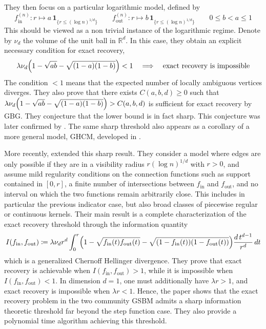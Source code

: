 \documentclass[runningheads]{llncs}
\begin{document}
They then focus on a particular logarithmic model, defined by
\[
f_\mathrm{in}^{(n)}: r \mapsto a\,\mathbf 1_{\{r\le (\log n)^{1/d}\}}
\qquad
f_\mathrm{out}^{(n)}: r \mapsto b\,\mathbf 1_{\{r\le (\log n)^{1/d}\}}
\qquad 0\le b<a\le 1
\]
This should be viewed as a non trivial instance of the logarithmic regime. Denote by \(\nu_d\) the volume of the unit ball in \(\mathbb R^d\). In this case, they obtain an explicit necessary condition for exact recovery,
\begin{equation}\label{eq:GSBM_log_impossibility}
    \lambda \nu_d\Bigl(1-\sqrt{ab}-\sqrt{(1-a)(1-b)}\Bigr)<1
    \quad\Longrightarrow\quad
    \text{exact recovery is impossible}
\end{equation}
The condition \(<1\) means that the expected number of locally ambiguous vertices diverges. They also prove that there exists \(C(a,b,d) \geq 0\) such that
\(\lambda \nu_d\Bigl(1-\sqrt{ab}-\sqrt{(1-a)(1-b)}\Bigr)>C(a,b,d)\) 
is sufficient for exact recovery by GBG. They conjecture that the lower bound is in fact sharp. This conjecture was later confirmed by \citep{gaudio2024exactcommunityrecoverygeometric}. The same sharp threshold also appears as a corollary of a more general model, GHCM, developed in \citep{gaudio2024exact}.

More recently, \citep{gaudio2025exactrecoverygeometricsbm} extended this sharp result. They consider a model where edges are only possible if they are in a visibility radius \(r(\log n)^{1/d}\) with \(r>0\), and assume mild regularity conditions on the connection functions such as support contained in \([0,r]\), a finite number of intersections between \(f_\mathrm{in}\) and \(f_\mathrm{out}\), and no interval on which the two functions remain arbitrarily close. This includes in particular the previous indicator case, but also broad classes of piecewise regular or continuous kernels. Their main result is a complete characterization of the exact recovery threshold through the information quantity
\[
I(f_\mathrm{in},f_\mathrm{out})
\coloneqq
\lambda \nu_d r^d
\int_0^r
\Bigl(
1-\sqrt{f_\mathrm{in}(t)f_\mathrm{out}(t)}
-\sqrt{(1-f_\mathrm{in}(t))(1-f_\mathrm{out}(t))}
\Bigr)
\frac{d\,t^{d-1}}{r^d}\,dt
\]
which is a generalized Chernoff Hellinger divergence. They prove that exact recovery is achievable when \(I(f_\mathrm{in},f_\mathrm{out})>1\), while it is impossible when \(I(f_\mathrm{in},f_\mathrm{out})<1\). In dimension \(d=1\), one must additionally have \(\lambda r>1\), and exact recovery is impossible when \(\lambda r<1\). Hence, the paper shows that the exact recovery problem in the two community GSBM admits a sharp information theoretic threshold far beyond the step function case. They also provide a polynomial time algorithm achieving this threshold.
\end{document}
